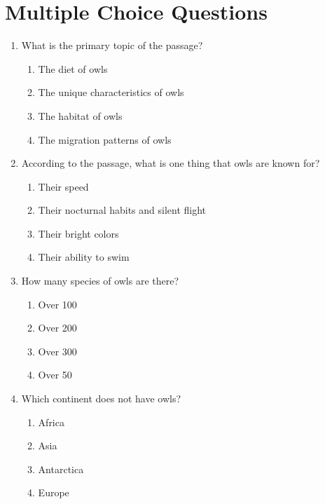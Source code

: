 \documentclass[12pt]{article}
\begin{document}
\section*{Multiple Choice Questions}

\begin{enumerate}

\item What is the primary topic of the passage?
\begin{enumerate}[label=\Alph*.]
    \item The diet of owls
    \item The unique characteristics of owls
    \item The habitat of owls
    \item The migration patterns of owls
\end{enumerate}

\vspace{0.5cm}

\item According to the passage, what is one thing that owls are known for?
\begin{enumerate}[label=\Alph*.]
    \item Their speed
    \item Their nocturnal habits and silent flight
    \item Their bright colors
    \item Their ability to swim
\end{enumerate}

\vspace{0.5cm}

\item How many species of owls are there?
\begin{enumerate}[label=\Alph*.]
    \item Over 100
    \item Over 200
    \item Over 300
    \item Over 50
\end{enumerate}

\vspace{0.5cm}

\item Which continent does not have owls?
\begin{enumerate}[label=\Alph*.]
    \item Africa
    \item Asia
    \item Antarctica
    \item Europe
\end{enumerate}


\end{enumerate}
\end{document}
